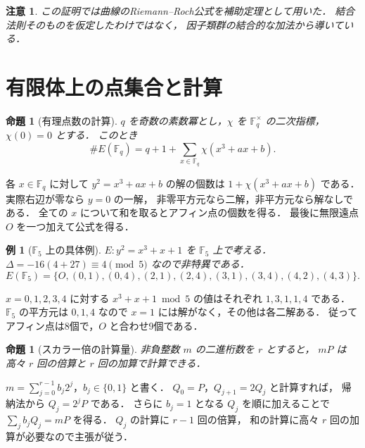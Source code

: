 \documentclass[a5paper,10pt,onecolumn]{jsarticle}
\makeatletter
\theoremstyle{mathnotetheorem}
\newtheorem{proposition}[theorem]{命題}
\newtheorem{example}[theorem]{例}
\newtheorem{remark}[theorem]{注意}
\renewcommand{\proofname}{証明}
\renewenvironment{proof}[1][\proofname]{%
  \par\pushQED{\qed}\normalfont\topsep4\p@\@plus2\p@\relax
  \trivlist\item[\hskip\labelsep\bfseries #1]\ignorespaces
}{\popQED\endtrivlist\@endpefalse}
\makeatother
\begin{document}
\begin{remark}
この証明では曲線のRiemann--Roch公式を補助定理として用いた．
結合法則そのものを仮定したわけではなく，
因子類群の結合的な加法から導いている．
\end{remark}

\section{有限体上の点集合と計算}

\begin{proposition}[有理点数の計算]\label{prop:count}
$q$ を奇数の素数冪とし，$\chi$ を
$\mathbb F_q^\times$ の二次指標，$\chi(0)=0$ とする．
このとき
\[
 \#E(\mathbb F_q)
 =q+1+\sum_{x\in\mathbb F_q}\chi(x^3+ax+b).
\]
\end{proposition}
\begin{proof}
各 $x\in\mathbb F_q$ に対して
$y^2=x^3+ax+b$ の解の個数は
$1+\chi(x^3+ax+b)$ である．
実際右辺が零なら $y=0$ の一解，
非零平方元なら二解，非平方元なら解なしである．
全ての $x$ について和を取るとアフィン点の個数を得る．
最後に無限遠点 $O$ を一つ加えて公式を得る．
\end{proof}

\begin{example}[$\mathbb F_5$ 上の具体例]
$E:y^2=x^3+x+1$ を $\mathbb F_5$ 上で考える．
$\Delta=-16(4+27)\equiv4\pmod5$ なので非特異である．
\[
 E(\mathbb F_5)=
 \{O,(0,1),(0,4),(2,1),(2,4),(3,1),(3,4),(4,2),(4,3)\}.
\]
\end{example}
\begin{proof}
$x=0,1,2,3,4$ に対する
$x^3+x+1\bmod5$ の値はそれぞれ
$1,3,1,1,4$ である．
$\mathbb F_5$ の平方元は $0,1,4$ なので
$x=1$ には解がなく，その他は各二解ある．
従ってアフィン点は8個で，$O$ と合わせ9個である．
\end{proof}

\begin{proposition}[スカラー倍の計算量]\label{prop:double-add}
非負整数 $m$ の二進桁数を $r$ とすると，
$mP$ は高々 $r$ 回の倍算と $r$ 回の加算で計算できる．
\end{proposition}
\begin{proof}
$m=\sum_{j=0}^{r-1}b_j2^j$，$b_j\in\{0,1\}$ と書く．
$Q_0=P$，$Q_{j+1}=2Q_j$ と計算すれば，
帰納法から $Q_j=2^jP$ である．
さらに $b_j=1$ となる $Q_j$ を順に加えることで
$\sum_jb_jQ_j=mP$ を得る．
$Q_j$ の計算に $r-1$ 回の倍算，
和の計算に高々 $r$ 回の加算が必要なので主張が従う．
\end{proof}
\end{document}
